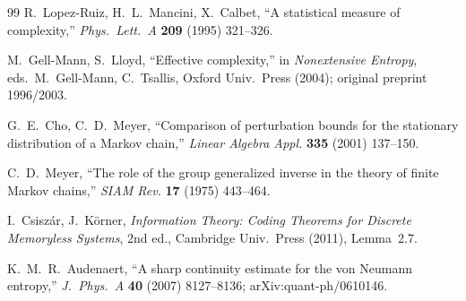 \documentclass[11pt]{article}
\begin{document}
\begin{thebibliography}{99}
R.~Lopez-Ruiz, H.~L.~Mancini, X.~Calbet,
``A statistical measure of complexity,''
\emph{Phys.\ Lett.\ A} \textbf{209} (1995) 321--326.

M.~Gell-Mann, S.~Lloyd,
``Effective complexity,''
in \emph{Nonextensive Entropy}, eds.\ M.~Gell-Mann, C.~Tsallis,
Oxford Univ.\ Press (2004); original preprint 1996/2003.

G.~E.~Cho, C.~D.~Meyer,
``Comparison of perturbation bounds for the stationary distribution
of a Markov chain,''
\emph{Linear Algebra Appl.} \textbf{335} (2001) 137--150.

C.~D.~Meyer,
``The role of the group generalized inverse in the theory of
finite Markov chains,''
\emph{SIAM Rev.} \textbf{17} (1975) 443--464.

I.~Csisz\'ar, J.~K\"orner,
\emph{Information Theory: Coding Theorems for Discrete Memoryless Systems},
2nd ed., Cambridge Univ.\ Press (2011), Lemma~2.7.

K.~M.~R.~Audenaert,
``A sharp continuity estimate for the von Neumann entropy,''
\emph{J.\ Phys.\ A} \textbf{40} (2007) 8127--8136;
arXiv:quant-ph/0610146.
\end{thebibliography}
\end{document}
